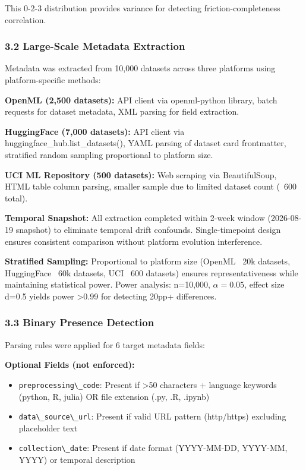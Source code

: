 This 0-2-3 distribution provides variance for detecting friction-completeness correlation.

\subsubsection{3.2 Large-Scale Metadata Extraction}

Metadata was extracted from 10,000 datasets across three platforms using platform-specific methods:

\textbf{OpenML (2,500 datasets):} API client via openml-python library, batch requests for dataset metadata, XML parsing for field extraction.

\textbf{HuggingFace (7,000 datasets):} API client via huggingface\_hub.list\_datasets(), YAML parsing of dataset card frontmatter, stratified random sampling proportional to platform size.

\textbf{UCI ML Repository (500 datasets):} Web scraping via BeautifulSoup, HTML table column parsing, smaller sample due to limited dataset count (~600 total).

\textbf{Temporal Snapshot:} All extraction completed within 2-week window (2026-08-19 snapshot) to eliminate temporal drift confounds. Single-timepoint design ensures consistent comparison without platform evolution interference.

\textbf{Stratified Sampling:} Proportional to platform size (OpenML ~20k datasets, HuggingFace ~60k datasets, UCI ~600 datasets) ensures representativeness while maintaining statistical power. Power analysis: n=10,000, $\alpha =0.05$, effect size d=0.5 yields power >0.99 for detecting 20pp+ differences.

\subsubsection{3.3 Binary Presence Detection}

Parsing rules were applied for 6 target metadata fields:

\textbf{Optional Fields (not enforced):}
\begin{itemize}
\item \texttt{preprocessing\textbackslash \_code}: Present if >50 characters + language keywords (python, R, julia) OR file extension (.py, .R, .ipynb)
\item \texttt{data\textbackslash \_source\textbackslash \_url}: Present if valid URL pattern (http/https) excluding placeholder text
\item \texttt{collection\textbackslash \_date}: Present if date format (YYYY-MM-DD, YYYY-MM, YYYY) or temporal description
\end{itemize}

